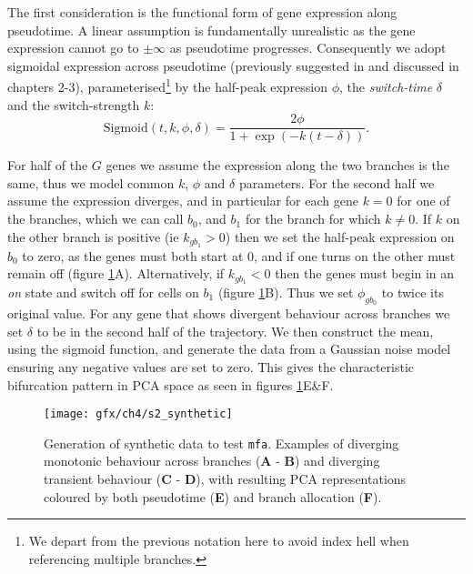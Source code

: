 The first consideration is the functional form of gene expression along pseudotime. A linear assumption is fundamentally unrealistic as the gene expression cannot go to $\pm \infty$ as pseudotime progresses. Consequently we adopt sigmoidal expression across pseudotime (previously suggested in \cite{campbell2016order,campbell2016switchde} and discussed in chapters 2-3), parameterised\footnote{We depart from the previous notation here to avoid index hell when referencing multiple branches.} by the half-peak expression $\phi$, the \emph{switch-time} $\delta$ and the switch-strength $k$:
\begin{equation}\label{eq:sigmoid}
      \text{Sigmoid}(t, k, \phi, \delta)  = \frac{2 \phi}{1 + \exp(-k(t - \delta))}.
\end{equation}


For half of the $G$ genes we assume the expression along the two branches is the same, thus we model common $k$, $\phi$ and $\delta$ parameters. For the second half we assume the expression diverges, and in particular for each gene $k = 0$ for one of the branches, which we can call $b_0$, and $b_1$ for the branch for which $k \neq 0$. If $k$ on the other branch is positive (ie $k_{gb_1} > 0$) then we set the half-peak expression on $b_0$ to zero, as the genes must both start at 0, and if one turns on the other must remain off (figure \ref{fig:mfa_synthetic}A).
Alternatively, if $k_{gb_1} < 0$ then the genes must begin in an \emph{on} state and switch off for cells on $b_1$ (figure \ref{fig:mfa_synthetic}B). Thus we set $\phi_{gb_0}$ to twice its original value. For any gene that shows divergent behaviour across branches we set $\delta$ to be in the second half of the trajectory. We then construct the mean, using the sigmoid function, and generate the data from a Gaussian noise model ensuring any negative values are set to zero. This gives the characteristic bifurcation pattern in PCA space as seen in figures \ref{fig:mfa_synthetic}E\&F.


\begin{figure}
	\centering
	\texttt{[image: gfx/ch4/s2\_synthetic]}
	\caption[Generation of synthetic data to test \texttt{mfa}.]{Generation of synthetic data to test \texttt{mfa}. Examples of diverging monotonic behaviour across branches (\textbf{A} - \textbf{B}) and diverging transient behaviour (\textbf{C} - \textbf{D}), with resulting PCA representations coloured by both pseudotime (\textbf{E}) and branch allocation (\textbf{F}).} \label{fig:mfa_synthetic}
\end{figure}

